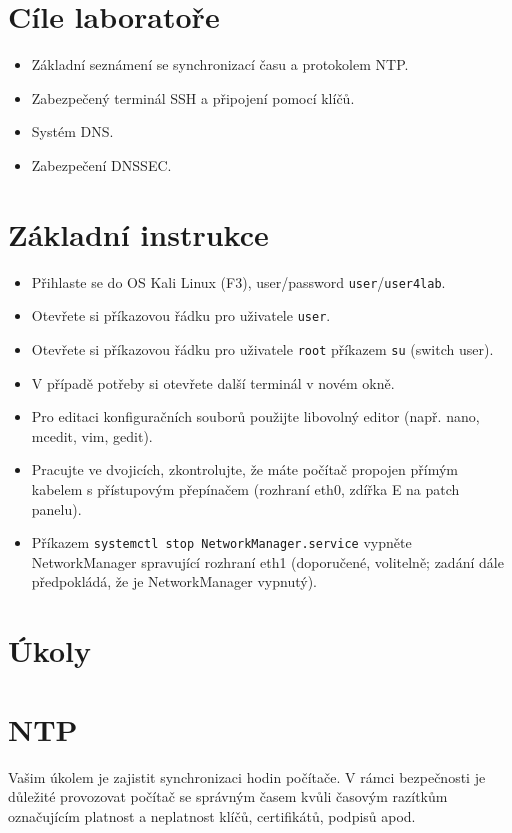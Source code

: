 
\section*{Cíle laboratoře}
\begin{itemize}
  \item Základní seznámení se synchronizací času a protokolem NTP.
  \item Zabezpečený terminál SSH a připojení pomocí klíčů.
  \item Systém DNS.
  \item Zabezpečení DNSSEC.
\end{itemize}

\section*{Základní instrukce}
\begin{itemize}
  \item Přihlaste se do OS Kali Linux (F3), user/password {\tt user}/{\tt user4lab}.
  \item Otevřete si příkazovou řádku pro uživatele {\tt user}.
  \item Otevřete si příkazovou řádku pro uživatele {\tt root} příkazem {\tt su}
  (switch user).
  \item V případě potřeby si otevřete další terminál v novém okně.
  \item Pro editaci konfiguračních souborů použijte libovolný editor (např.
  nano, mcedit, vim, gedit).
  \item Pracujte ve dvojicích, zkontrolujte, že máte počítač propojen
    přímým kabelem s přístupovým přepínačem (rozhraní eth0, zdířka E na patch
    panelu).
  \item Příkazem {\tt systemctl stop NetworkManager.service} vypněte
    NetworkManager spravující rozhraní eth1 (doporučené, volitelně; zadání dále
    předpokládá, že je NetworkManager vypnutý).

\end{itemize}

\section*{Úkoly}
\section{NTP}

Vašim úkolem je zajistit synchronizaci hodin počítače. V rámci bezpečnosti je
důležité provozovat počítač se správným časem kvůli časovým razítkům
označujícím platnost a neplatnost klíčů, certifikátů, podpisů apod.

